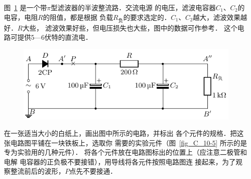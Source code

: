 图~\ref{fig_C_10-4} 是一个带$\pi$型滤波器的半波整流路．交流电源
的电压，滤波电容器$C_1$、$C_2$的电容，电阻$R$的阻值，都是根据
负载$R_{\text{负}}$的要求选定的．$C_1$、$C_2$越大，滤波效果越好．$R$大些，
滤波效果好些，但电压损失也大些，图中的数据可作参考．
这个电路可提供5—6伏特的直流电．
\begin{figure}[htbp]
    \centering
    \includegraphics{fig/C/10-4.pdf}
    \caption{}\label{fig_C_10-4}
\end{figure}

在一张适当大小的白纸上，画出图中所示的电路，并标出
各个元件的规格．把这张电路图平铺在一块铁板上，选取你
需要的实验元件（图~\ref{fig_C_10-5} 所示的是专为实验用的几种元件）．
将各个元件放在电路图标出的位置上（应注意二极管和电解
电容器的正负极不要接错），用导线将各元件按照电路图连
接起来，为了观察整流前后的波形，$P$点先不要接通．

